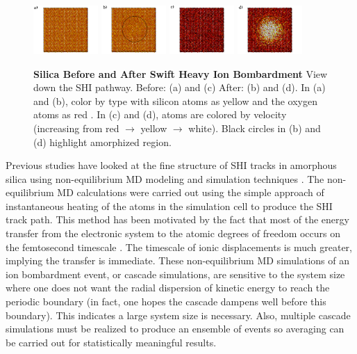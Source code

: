 \begin{figure}
  \begin{center}
    \includegraphics[width=0.22\textwidth]{graphics/initial_atoms.png}
    \includegraphics[width=0.22\textwidth]{graphics/spike_atoms.png}
    \includegraphics[width=0.22\textwidth]{graphics/initial.png}
    \includegraphics[width=0.22\textwidth]{graphics/spike.png}
  
  \caption{ \textbf{Silica Before and After Swift Heavy Ion Bombardment} View down the SHI pathway. Before: (a) and (c) After: (b) and (d). In (a) and (b), color by type with silicon atoms as \color{Dandelion} yellow \color{black} and the oxygen atoms as \color{BrickRed} red \color{black}. In (c) and (d), atoms are colored by velocity (increasing from \color{BrickRed} red \color{black} $\to$ \color{Dandelion} yellow \color{black} $\to$ \color{black} white). Black circles in (b) and (d) highlight amorphized region.}\label{shi_track}
  \end{center}
\end{figure}

Previous studies have looked at the fine structure of SHI tracks in amorphous silica using non-equilibrium MD modeling and simulation techniques \cite{Kluth2008, Kluth2011}. The non-equilibrium MD calculations were carried out using the simple approach of instantaneous heating of the atoms in the simulation cell to produce the SHI track path. This method has been motivated by the fact that most of the energy transfer from the electronic system to the atomic degrees of freedom occurs on the femtosecond timescale \cite{ Krasheninnikov2010}.  The timescale of ionic displacements is much greater, implying the transfer is immediate. These non-equilibrium MD simulations of an ion bombardment event, or cascade simulations, are sensitive to the system size where one does not want the radial dispersion of kinetic energy to reach the periodic boundary (in fact, one hopes the cascade dampens well before this boundary). This indicates a large system size is necessary. Also, multiple cascade simulations must be realized to produce an ensemble of events so averaging can be carried out for statistically meaningful results.

